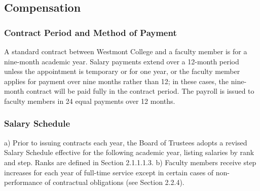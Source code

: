 \documentclass[letterpaper, 11pt]{article}
\begin{document}
	\subsection{Compensation}
		\subsubsection{Contract Period and Method of Payment}
			A standard contract between Westmont College and a faculty member is for a nine-month academic year.  Salary payments extend over a 12-month period unless the appointment is temporary or for one year, or the faculty member applies for payment over nine months rather than 12; in these cases, the nine-month contract will be paid fully in the contract period.  The payroll is issued to faculty members in 24 equal payments over 12 months.
		\subsubsection{Salary Schedule}
			a) Prior to issuing contracts each year, the Board of Trustees adopts a revised Salary Schedule effective for the following academic year, listing salaries by rank and step.  Ranks are defined in Section 2.1.1.1.3.
			b) Faculty members receive step increases for each year of full-time service except in certain cases of non-performance of contractual obligations (see Section 2.2.4).
\end{document}
